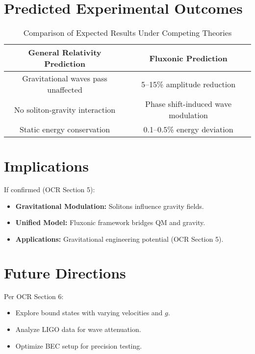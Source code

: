 \documentclass{article}
\begin{document}
\section{Predicted Experimental Outcomes}
\begin{table}[h]
    \centering
    \begin{tabular}{|c|c|}
        \hline
        \textbf{General Relativity Prediction} & \textbf{Fluxonic Prediction} \\
        \hline
        Gravitational waves pass unaffected & 5–15\% amplitude reduction \\
        No soliton-gravity interaction & Phase shift-induced wave modulation \\
        Static energy conservation & 0.1–0.5\% energy deviation \\
        \hline
    \end{tabular}
    \caption{Comparison of Expected Results Under Competing Theories}
    \label{tab:predictions}
\end{table}

\section{Implications}
If confirmed (OCR Section 5):
\begin{itemize}
    \item \textbf{Gravitational Modulation:} Solitons influence gravity fields.
    \item \textbf{Unified Model:} Fluxonic framework bridges QM and gravity.
    \item \textbf{Applications:} Gravitational engineering potential (OCR Section 5).
\end{itemize}

\section{Future Directions}
Per OCR Section 6:
\begin{itemize}
    \item Explore bound states with varying velocities and \(g\).
    \item Analyze LIGO data for wave attenuation.
    \item Optimize BEC setup for precision testing.
\end{itemize}
\end{document}
